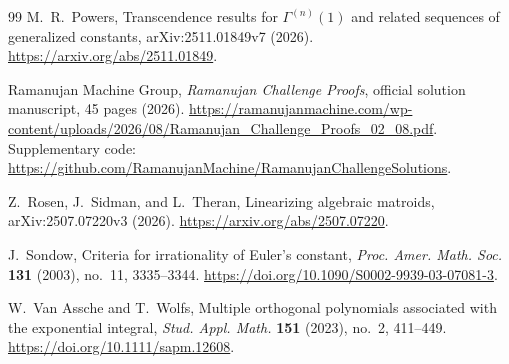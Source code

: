 \documentclass[11pt]{article}
\theoremstyle{keio}
\theoremstyle{definition}
\theoremstyle{remark}
\begin{document}
\begin{thebibliography}{99}
M.~R.~Powers,
\newblock Transcendence results for
\(\Gamma^{(n)}(1)\) and related sequences of generalized constants,
\newblock arXiv:2511.01849v7 (2026).
\newblock \url{https://arxiv.org/abs/2511.01849}.

Ramanujan Machine Group,
\newblock \emph{Ramanujan Challenge Proofs},
\newblock official solution manuscript, 45 pages (2026).
\newblock
\url{https://ramanujanmachine.com/wp-content/uploads/2026/08/Ramanujan_Challenge_Proofs_02_08.pdf}.
\newblock Supplementary code:
\url{https://github.com/RamanujanMachine/RamanujanChallengeSolutions}.

Z.~Rosen, J.~Sidman, and L.~Theran,
\newblock Linearizing algebraic matroids,
\newblock arXiv:2507.07220v3 (2026).
\newblock \url{https://arxiv.org/abs/2507.07220}.

J.~Sondow,
\newblock Criteria for irrationality of Euler's constant,
\newblock \emph{Proc. Amer. Math. Soc.} \textbf{131} (2003), no.~11,
3335--3344.
\newblock \url{https://doi.org/10.1090/S0002-9939-03-07081-3}.

W.~Van Assche and T.~Wolfs,
\newblock Multiple orthogonal polynomials associated with the exponential
integral,
\newblock \emph{Stud. Appl. Math.} \textbf{151} (2023), no.~2, 411--449.
\newblock \url{https://doi.org/10.1111/sapm.12608}.

\end{thebibliography}
\end{document}
